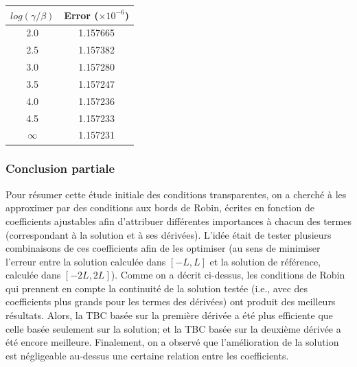 \begingroup
\begin{center}
		\begin{tabular}{c|c}
			$log(\gamma/\beta)$ & Error ($\times 10^{-6}$) \\
			\hline
			2.0 & 1.157665\\
			2.5 & 1.157382\\
			3.0 & 1.157280\\
			3.5 & 1.157247\\
			4.0 & 1.157236\\
			4.5 & 1.157233\\
			$\infty$ & 1.157231	
		\end{tabular}
\end{center}
\endgroup

\subsubsection{Conclusion partiale} 

\indent Pour résumer cette étude initiale des conditions transparentes, on a cherché à les approximer par des conditions aux bords de Robin, écrites en fonction de coefficients ajustables afin d'attribuer différentes importances à chacun des termes (correspondant à la solution et à ses dérivées). L'idée était de tester plusieurs combinaisons de ces coefficients afin de les optimiser (au sens de minimiser l'erreur entre la solution calculée dans $[-L,L]$ et la solution de référence, calculée dans $[-2L,2L]$). Comme on a décrit ci-dessus, les conditions de Robin qui prennent en compte la continuité de la solution testée (i.e., avec des coefficients plus grands pour les termes des dérivées) ont produit des meilleurs résultats. Alors, la TBC basée sur la première dérivée a été plus efficiente que celle basée seulement sur la solution; et la TBC basée sur la deuxième dérivée a été encore meilleure. Finalement, on a observé que l'amélioration de la solution est négligeable au-dessus une certaine relation entre les coefficients.
















